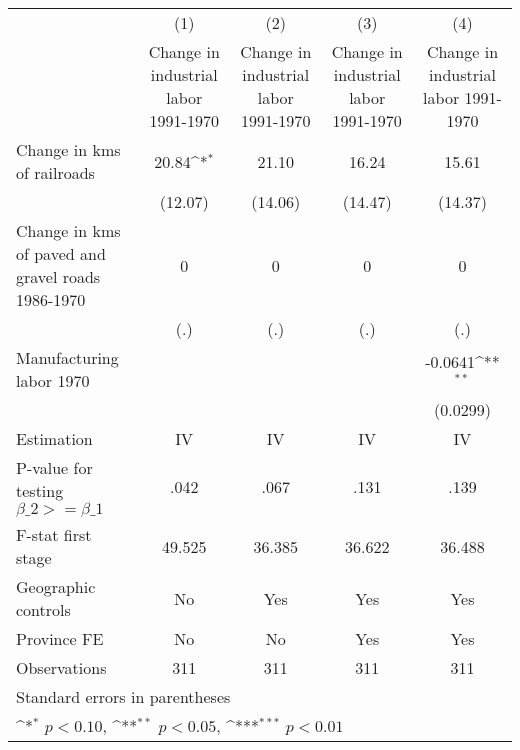 {
\def\sym#1{\ifmmode^{#1}\else\(^{#1}\)\fi}
\begin{tabular}{l*{4}{c}}
\hline\hline
                &\multicolumn{1}{c}{(1)}&\multicolumn{1}{c}{(2)}&\multicolumn{1}{c}{(3)}&\multicolumn{1}{c}{(4)}\\
                &\multicolumn{1}{c}{Change in industrial labor 1991-1970}&\multicolumn{1}{c}{Change in industrial labor 1991-1970}&\multicolumn{1}{c}{Change in industrial labor 1991-1970}&\multicolumn{1}{c}{Change in industrial labor 1991-1970}\\
\hline
Change in kms of railroads&    20.84\sym{*}  &    21.10         &    16.24         &    15.61         \\
                &  (12.07)         &  (14.06)         &  (14.47)         &  (14.37)         \\
[1em]
Change in kms of paved and gravel roads 1986-1970&        0         &        0         &        0         &        0         \\
                &      (.)         &      (.)         &      (.)         &      (.)         \\
[1em]
Manufacturing labor 1970&                  &                  &                  &  -0.0641\sym{**} \\
                &                  &                  &                  & (0.0299)         \\
\hline
Estimation      &       IV         &       IV         &       IV         &       IV         \\
P-value for testing $\beta\_2 >= \beta\_1$&     .042         &     .067         &     .131         &     .139         \\
F-stat first stage&   49.525         &   36.385         &   36.622         &   36.488         \\
Geographic controls&       No         &      Yes         &      Yes         &      Yes         \\
Province FE     &       No         &       No         &      Yes         &      Yes         \\
Observations    &      311         &      311         &      311         &      311         \\
\hline\hline
\multicolumn{5}{l}{\footnotesize Standard errors in parentheses}\\
\multicolumn{5}{l}{\footnotesize \sym{*} \(p<0.10\), \sym{**} \(p<0.05\), \sym{***} \(p<0.01\)}\\
\end{tabular}
}
